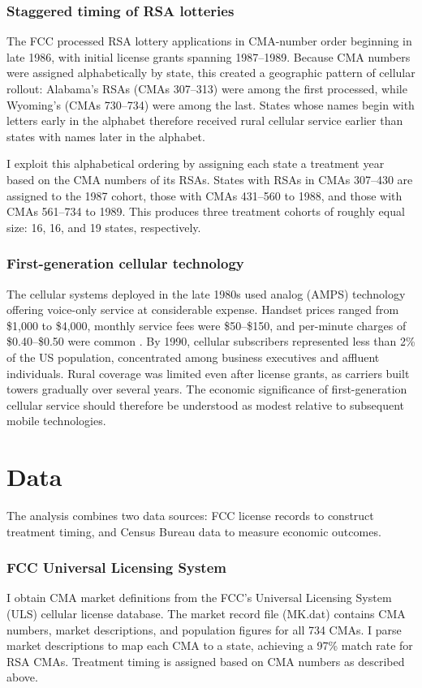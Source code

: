 \documentclass[12pt]{article}
\begin{document}
\subsubsection*{Staggered timing of RSA lotteries} The FCC processed RSA lottery applications in CMA-number order beginning in late 1986, with initial license grants spanning 1987--1989. Because CMA numbers were assigned alphabetically by state, this created a geographic pattern of cellular rollout: Alabama's RSAs (CMAs 307--313) were among the first processed, while Wyoming's (CMAs 730--734) were among the last. States whose names begin with letters early in the alphabet therefore received rural cellular service earlier than states with names later in the alphabet.

I exploit this alphabetical ordering by assigning each state a treatment year based on the CMA numbers of its RSAs. States with RSAs in CMAs 307--430 are assigned to the 1987 cohort, those with CMAs 431--560 to 1988, and those with CMAs 561--734 to 1989. This produces three treatment cohorts of roughly equal size: 16, 16, and 19 states, respectively.

\subsubsection*{First-generation cellular technology} The cellular systems deployed in the late 1980s used analog (AMPS) technology offering voice-only service at considerable expense. Handset prices ranged from \$1,000 to \$4,000, monthly service fees were \$50--\$150, and per-minute charges of \$0.40--\$0.50 were common \citep{hausman1997}. By 1990, cellular subscribers represented less than 2\% of the US population, concentrated among business executives and affluent individuals. Rural coverage was limited even after license grants, as carriers built towers gradually over several years. The economic significance of first-generation cellular service should therefore be understood as modest relative to subsequent mobile technologies.

\section{Data}

The analysis combines two data sources: FCC license records to construct treatment timing, and Census Bureau data to measure economic outcomes.

\subsubsection*{FCC Universal Licensing System} I obtain CMA market definitions from the FCC's Universal Licensing System (ULS) cellular license database. The market record file (MK.dat) contains CMA numbers, market descriptions, and population figures for all 734 CMAs. I parse market descriptions to map each CMA to a state, achieving a 97\% match rate for RSA CMAs. Treatment timing is assigned based on CMA numbers as described above.
\end{document}
